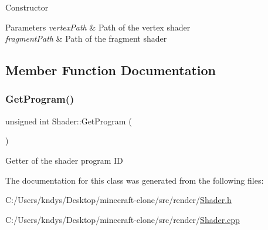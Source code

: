 Constructor 


\begin{DoxyParams}{Parameters}
{\em vertex\+Path} & Path of the vertex shader\\
\hline
{\em fragment\+Path} & Path of the fragment shader\\
\hline
\end{DoxyParams}


\subsection{Member Function Documentation}
\mbox{\label{class_shader_a2c8b39f95cb2dd13b0309960d1d835d7}} 
\subsubsection{\texorpdfstring{Get\+Program()}{GetProgram()}}
{\footnotesize\ttfamily unsigned int Shader\+::\+Get\+Program (\begin{DoxyParamCaption}{ }\end{DoxyParamCaption})}



Getter of the shader program ID 



The documentation for this class was generated from the following files\+:\begin{DoxyCompactItemize}
\item 
C\+:/\+Users/kndys/\+Desktop/minecraft-\/clone/src/render/\mbox{\hyperlink{_shader_8h}{Shader.\+h}}\item 
C\+:/\+Users/kndys/\+Desktop/minecraft-\/clone/src/render/\mbox{\hyperlink{_shader_8cpp}{Shader.\+cpp}}\end{DoxyCompactItemize}
